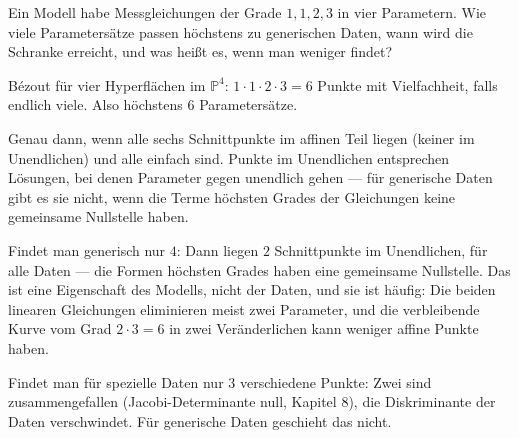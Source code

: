 \begin{aufgabe}
Ein Modell habe Messgleichungen der Grade $1, 1, 2, 3$ in vier Parametern. Wie viele Parametersätze passen höchstens zu generischen Daten, wann wird die Schranke erreicht, und was heißt es, wenn man weniger findet?

\loesung
{}
Bézout für vier Hyperflächen im $\mathbb P^{4}$: $1\cdot1\cdot2\cdot3 = 6$ Punkte mit Vielfachheit, falls endlich viele. Also höchstens $6$ Parametersätze.

Genau dann, wenn alle sechs Schnittpunkte im affinen Teil liegen (keiner im Unendlichen) und alle einfach sind. Punkte im Unendlichen entsprechen Lösungen, bei denen Parameter gegen unendlich gehen --- für generische Daten gibt es sie nicht, wenn die Terme höchsten Grades der Gleichungen keine gemeinsame Nullstelle haben.

Findet man generisch nur $4$: Dann liegen $2$ Schnittpunkte im Unendlichen, für alle Daten --- die Formen höchsten Grades haben eine gemeinsame Nullstelle. Das ist eine Eigenschaft des Modells, nicht der Daten, und sie ist häufig: Die beiden linearen Gleichungen eliminieren meist zwei Parameter, und die verbleibende Kurve vom Grad $2\cdot3 = 6$ in zwei Veränderlichen kann weniger affine Punkte haben.

Findet man für spezielle Daten nur $3$ verschiedene Punkte: Zwei sind zusammengefallen (Jacobi-Determinante null, Kapitel 8), die Diskriminante der Daten verschwindet. Für generische Daten geschieht das nicht.

\begin{center}
\begin{minipage}{0.88\textwidth}
\end{minipage}
\end{center}
\end{aufgabe}

